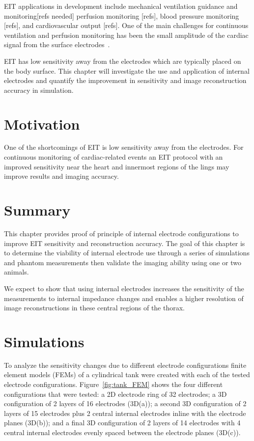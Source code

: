 EIT applications in development include mechanical ventilation 
guidance and monitoring[refs needed] perfusion monitoring [refs], 
blood pressure monitoring [refs], and cardiovascular
output [refs]. 
One of the main challenges for continuous ventilation 
and perfusion monitoring has been
the small amplitude of the cardiac signal from the surface 
electrodes~\parencite{nguyen_review_2012}. %



EIT has low sensitivity away from the electrodes which are typically placed on the body surface. 
This chapter will investigate the use and application of internal electrodes and quantify the improvement 
in sensitivity and image reconstruction accuracy in simulation.

\section{Motivation}
One of the shortcomings of EIT is low sensitivity away from the electrodes. 
For continuous monitoring of cardiac-related events an EIT protocol with an improved sensitivity 
near the heart and innermost regions of the lings may improve results and imaging accuracy.


\section{Summary}
This chapter provides proof of principle of internal electrode configurations to 
improve EIT sensitivity and reconstruction accuracy.
The goal of this chapter is to determine the viability of internal electrode use through a series of simulations and phantom measurements then validate
the imaging ability using one or two animals. 

We expect to show that using internal electrodes increases the sensitivity of the measurements to internal impedance changes 
and enables a higher resolution of image reconstructions in these central regions of the thorax. 

\section{Simulations}
To analyze the sensitivity changes due to different electrode 
configurations finite element models (FEMs) of a cylindrical tank were 
created with each of the tested electrode configurations. Figure~\ref{fig:tank_FEM} shows the four 
different configurations that were tested: a 2D 
electrode ring of 32 electrodes; a 3D configuration of 2 layers of 16 
electrodes (3D(a)); a second 3D configuration of 2 layers of 15 electrodes 
plus 2 central internal electrodes inline with the electrode planes (3D(b)); and a final 3D configuration of 
2 layers of 14 electrodes with 4 central internal electrodes evenly spaced between the electrode planes (3D(c)).


